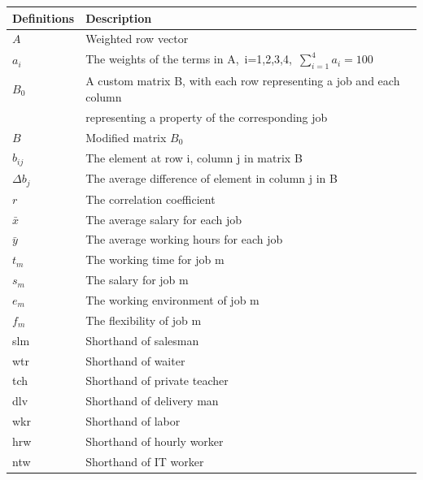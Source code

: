 \documentclass[12pt]{article}
\begin{document}
    \begin{table}[!htp]
    \begin{tabular*}{15cm}{ll}
            \hline
            Definitions & Description\\
            \hline
            $A$      & Weighted row vector\\%
            $a_i$ & The weights of the terms in A,~i=1,2,3,4,~$\sum_{i=1}^{4}a_i=100$\\%
            $B_{0}$      & A custom matrix B, with each row representing a job and each column\\ & representing a property of the corresponding job\\%
            $B$ & Modified matrix $B_{0}$\\%
            $b_{ij}$ & The element at row i, column j in matrix B\\
            $\Delta b_{j}$ & The average difference of element in column j in B\\%
            $r$ & The correlation coefficient\\
            $\bar{x}$ & The average salary for each job\\%
            $\bar{y}$ & The average working hours for each job\\%
            $t_{m}$ & The working time for job m\\
            $s_{m}$ & The salary for job m\\
            $e_{m}$ & The working environment of job m\\
            $f_{m}$ & The flexibility of job m\\
            slm & Shorthand of salesman\\
            wtr & Shorthand of waiter\\
            tch & Shorthand of private teacher\\
            dlv & Shorthand of delivery man\\
            wkr & Shorthand of labor\\
            hrw & Shorthand of hourly worker\\
            ntw & Shorthand of IT worker\\ 
    \end{tabular*}
\end{table}
\end{document}
